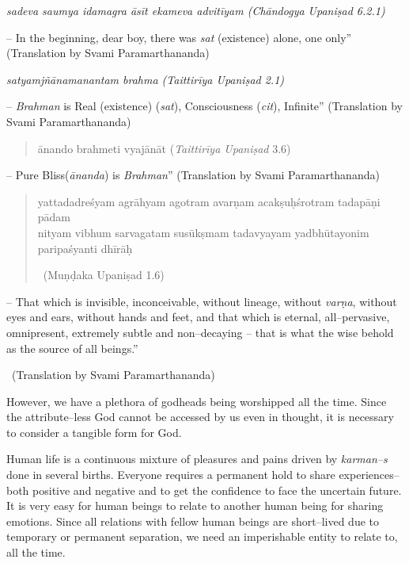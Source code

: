 \textit{sadeva saumya idamagra āsīt ekameva advitīyam  (Chāndogya Upaniṣad 6.2.1)}

\begin{myquote}
– In the beginning, dear boy, there was \textit{sat} (existence) alone, one only” (Translation by Svami Paramarthananda)
\end{myquote}

\textit{satyamjñānamanantam brahma  (Taittirīya Upaniṣad 2.1)}

\begin{myquote}
– \textit{Brahman} is Real (existence) (\textit{sat}), Consciousness (\textit{cit}), Infinite” (Translation by Svami Paramarthananda)
\end{myquote}

\begin{verse}
ānando brahmeti vyajānāt  (\textit{Taittirīya Upaniṣad} 3.6)
\end{verse}

\begin{myquote}
– Pure Bliss(\textit{ānanda}) is \textit{Brahman}” (Translation by Svami Paramarthananda)
\end{myquote}

\begin{verse}
yattadadreśyam agrāhyam agotram avarṇam acakṣuḥśrotram tadapāṇi pādam \\ nityam vibhum sarvagatam susūkṣmam tadavyayam yadbhūtayonim paripaśyanti dhīrāḥ  

~\hfill (Muṇḍaka Upaniṣad 1.6)
\end{verse}

\begin{myquote}
– That which is invisible, inconceivable, without lineage, without \textit{varṇa}, without eyes and ears, without hands and feet, and that which is eternal, all–pervasive, omnipresent, extremely subtle and non–decaying – that is what the wise behold as the source of all beings.” 

~\hfill (Translation by Svami Paramarthananda)
\end{myquote}

However, we have a plethora of godheads being worshipped all the time. Since the attribute–less God cannot be accessed by us even in thought, it is necessary to consider a tangible form for God.

Human life is a continuous mixture of pleasures and pains driven by \textit{karman–s} done in several births. Everyone requires a permanent hold to share experiences– both positive and negative and to get the confidence to face the uncertain future. It is very easy for human beings to relate to another human being for sharing emotions. Since all relations with fellow human beings are short–lived due to temporary or permanent separation, we need an imperishable entity to relate to, all the time.

